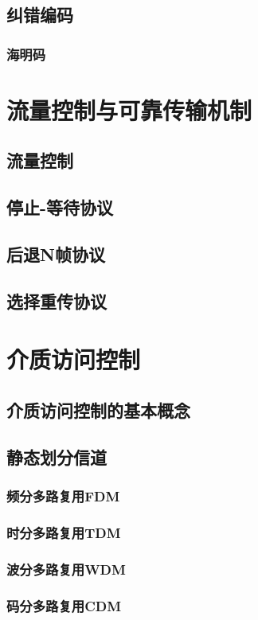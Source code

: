 \documentclass[lang=cn,newtx,10pt,scheme=chinese]{../../elegantbook}
\begin{document}
\subsection{纠错编码}
\subsubsection{海明码}

\section{流量控制与可靠传输机制}
\subsection{流量控制}
\subsection{停止-等待协议}
\subsection{后退N帧协议}
\subsection{选择重传协议}

\section{介质访问控制}
\subsection{介质访问控制的基本概念}
\subsection{静态划分信道}
\subsubsection{频分多路复用FDM}
\subsubsection{时分多路复用TDM}
\subsubsection{波分多路复用WDM}
\subsubsection{码分多路复用CDM}
\end{document}
